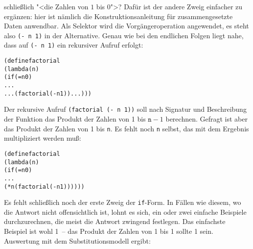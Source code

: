 schließlich "<die Zahlen von $1$ bis $0$">?  Dafür ist der andere Zweig
einfacher zu ergänzen: hier ist nämlich die Konstruktionsanleitung für
zusammengesetzte Daten anwendbar.  Als Selektor wird die
Vorgängeroperation angewendet, es steht also \texttt{(- n 1)} in der
Alternative.
Genau wie bei den endlichen Folgen liegt nahe, dass auf \texttt{(- n 1)} ein
rekursiver Aufruf erfolgt:
%
\begin{alltt}
(define factorial
  (lambda (n)
    (if (= n 0)
        ...
        ... (factorial (- n 1)) ...)))
\end{alltt}
%
Der rekursive Aufruf \texttt{(factorial (- n 1))} soll nach
Signatur und Beschreibung der Funktion das Produkt der Zahlen von 1 bis
$\texttt{n}-1$ berechnen.  Gefragt ist aber das Produkt der Zahlen von
1 bis \texttt{n}.  Es fehlt noch \texttt{n} selbst, das mit dem
Ergebnis multipliziert werden muß:
%
\begin{alltt}
(define factorial
  (lambda (n)
    (if (= n 0)
        ...
        (* n (factorial (- n 1))))))
\end{alltt}
%
Es fehlt schließlich noch der erste Zweig der \texttt{if}-Form.  In
Fällen wie diesem, wo die Antwort nicht offensichtlich ist,
lohnt es sich, ein oder zwei einfache Beispiele durchzurechnen, die meist die
Antwort zwingend festlegen.  Das einfachste Beispiel ist wohl 1~--
das Produkt der Zahlen von 1 bis 1 sollte 1 sein.  Auswertung mit dem
Substitutionsmodell ergibt:

